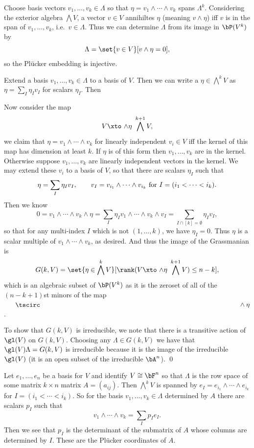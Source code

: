 \elemm

\bproof

    Choose basis vectors $v_1,\dots,v_k\in\Lambda$ so that $\eta=v_1\wedge\cdots\wedge v_k$ spans
    $\Lambda^k$.
    Considering the exterior algebra $\bigwedge V$, a vector $v\in V$ annihiltes $\eta$ (meaning
    $v\wedge\eta$) iff $v$ is in the span of $v_1,\dots,v_k$, i.e.\ $v\in\Lambda$.
    Thus we can determine $\Lambda$ from its image in $\bP(V^k)$ by
    $$ \Lambda = \set{v\in V}[v\wedge\eta=0] , $$
    so the Pl\"ucker embedding is injective.

    Extend a basis $v_1,\dots,v_k\in\Lambda$ to a basis of $V$.
    Then we can write a $\eta\in\bigwedge^kV$ as $\eta=\sum_I\eta_Iv_I$ for scalars $\eta_I$.
    Then

    Now consider the map
    $$ V \xtos{\wedge\eta} \bigwedge^{k+1}V , $$
    we claim that $\eta=v_1\wedge\cdots\wedge v_k$ for linearly independent $v_i\in V$ iff the kernel
    of this map has dimension at least $k$.
    If $\eta$ is of this form then $v_1,\dots,v_k$ are in the kernel.
    Otherwise suppose $v_1,\dots,v_k$ are linearly independent vectors in the kernel.
    We may extend these $v_i$ to a basis of $V$, so that there are scalars $\eta_I$ such that
    $$ \eta = \sum_I\eta_Iv_I,\qquad v_I = v_{i_1}\wedge\cdots\wedge v_{i_k}\hbox{ for $I=(i_1<\cdots<i_k)$} . $$
    Then we know
    $$ 0 = v_1\wedge\cdots\wedge v_k\wedge\eta = \sum_I\eta_Iv_1\wedge\cdots\wedge v_k\wedge v_I
    = \sum_{I\cap[k]=\emptyset}\eta_Iv_I , $$
    so that for any multi-index $I$ which is not $(1,\dots,k)$, we have $\eta_I=0$.
    Thus $\eta$ is a scalar multiple of $v_1\wedge\cdots\wedge v_k$, as desired.
    And thus the image of the Grassmanian is
    $$ G(k,V) = \set{\eta\in\bigwedge^kV}[\rank(V\xtos{\wedge\eta}\bigwedge^{k+1}V)\leq n-k] , $$
    which is an algebraic subset of $\bP(V^k)$ as it is the zeroset of all of the $(n-k+1)$st minors of
    the map $\bul\wedge\eta$.

    To show that $G(k,V)$ is irreducible, we note that there is a transitive action of $\gl(V)$ on
    $G(k,V)$.
    Choosing any $\Lambda\in G(k,V)$ we have that $\gl(V)\Lambda=G(k,V)$ is irreducible because
    it is the image of the irreducible $\gl(V)$ (it is an open subset of the irreducible $\bA^n$).
    \qed

\eproof

Let $e_1,\dots,e_n$ be a basis for $V$ and identify $V\cong\bF^n$ so that
$\Lambda$ is the row space of some matrix $k\times n$ matrix $A=(a_{ij})$.
Then $\bigwedge^kV$ is spanned by $e_I=e_{i_1}\wedge\cdots\wedge e_{i_k}$ for $I=(i_1<\cdots<i_k)$.
So for the basis $v_1,\dots,v_k\in\Lambda$ determined by $A$ there are scalars $p_I$ such that
$$ v_1\wedge\cdots\wedge v_k = \sum_Ip_Ie_I . $$
Then we see that $p_I$ is the determinant of the submatrix of $A$ whose columns are determined by $I$.
These are the {\emphcolor Pl\"ucker coordinates} of $A$.

